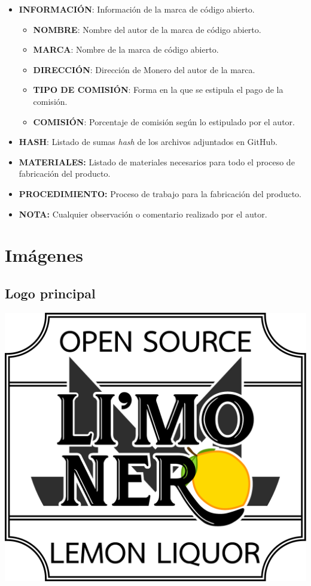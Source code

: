 \documentclass[12pt,a4paper]{article}
\begin{document}
\begin{itemize}
\item \textbf{INFORMACIÓN}: Información de la marca de código abierto.
	\begin{itemize}
	\item \textbf{NOMBRE}: Nombre del autor de la marca de código abierto.
	\item \textbf{MARCA}: Nombre de la marca de código abierto.
	\item \textbf{DIRECCIÓN}: Dirección de Monero del autor de la marca.
	\item \textbf{TIPO DE COMISIÓN}: Forma en la que se estipula el pago de la comisión.
	\item \textbf{COMISIÓN}: Porcentaje de comisión según lo estipulado por el autor.
	\end{itemize}
\item \textbf{HASH}: Listado de sumas \textit{hash} de los archivos adjuntados en GitHub.
\item \textbf{MATERIALES:} Listado de materiales necesarios para todo el proceso de fabricación del producto.
\item \textbf{PROCEDIMIENTO:} Proceso de trabajo para la fabricación del producto.
\item \textbf{NOTA:} Cualquier observación o comentario realizado por el autor.
\end{itemize}

\section{Imágenes}

\subsection{Logo principal}

\begin{center}
\includegraphics[width=1\textwidth]{img/logo.pdf}
\end{center}
\end{document}
